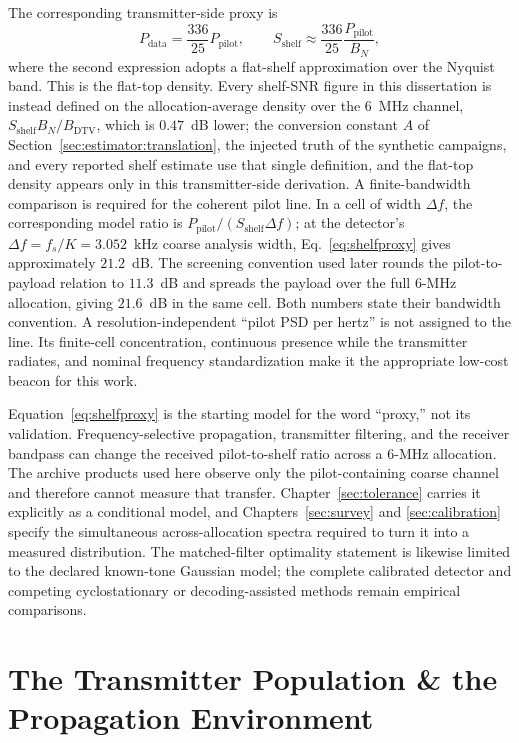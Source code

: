The corresponding transmitter-side proxy is
\begin{equation}
\label{eq:shelfproxy}
P_{\mathrm{data}} = \frac{336}{25}P_{\mathrm{pilot}},
\qquad
S_{\mathrm{shelf}} \approx
\frac{336}{25}\frac{P_{\mathrm{pilot}}}{B_N},
\end{equation}
where the second expression adopts a flat-shelf approximation over the Nyquist
band.  This is the flat-top density.  Every shelf-SNR figure in this
dissertation is instead defined on the allocation-average density over the
$6$~MHz channel, $S_{\mathrm{shelf}} B_N / B_{\mathrm{DTV}}$, which is $0.47$~dB
lower; the conversion constant $A$ of Section~\ref{sec:estimator:translation},
the injected truth of the synthetic campaigns, and every reported shelf
estimate use that single definition, and the flat-top density appears only in
this transmitter-side derivation.  A finite-bandwidth comparison is required for the coherent pilot line.
In a cell of width $\Delta f$, the corresponding model ratio is
$P_{\mathrm{pilot}}/(S_{\mathrm{shelf}}\Delta f)$; at the detector's
$\Delta f=f_s/K=3.052$~kHz coarse analysis width, Eq.~\eqref{eq:shelfproxy}
gives approximately $21.2$~dB.  The screening convention used later rounds the
pilot-to-payload relation to $11.3$~dB and spreads the payload over the full
6-MHz allocation, giving $21.6$~dB in the same cell.  Both numbers state their
bandwidth convention.  A resolution-independent ``pilot PSD per hertz'' is not
assigned to the line.  Its finite-cell concentration, continuous presence while
the transmitter radiates, and nominal frequency standardization make it the
appropriate low-cost beacon for this work.

Equation~\eqref{eq:shelfproxy} is the starting model for the word
``proxy,'' not its validation.  Frequency-selective propagation, transmitter
filtering, and the receiver bandpass can change the received pilot-to-shelf
ratio across a 6-MHz allocation.  The archive products used here observe only
the pilot-containing coarse channel and therefore cannot measure that transfer.
Chapter~\ref{sec:tolerance} carries it explicitly as a conditional model, and
Chapters~\ref{sec:survey} and \ref{sec:calibration} specify the simultaneous
across-allocation spectra required to turn it into a measured distribution.
The matched-filter optimality statement is likewise limited to the declared
known-tone Gaussian model; the complete calibrated detector and competing
cyclostationary or decoding-assisted methods remain empirical comparisons.

\section{The Transmitter Population \& the Propagation Environment}
\label{sec:dtv:environment}

